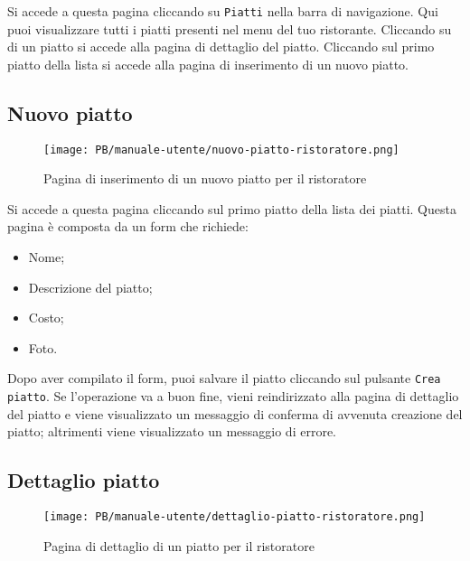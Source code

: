 Si accede a questa pagina cliccando su \texttt{Piatti} nella barra di
navigazione. Qui puoi visualizzare tutti i piatti presenti nel menu del tuo
ristorante. Cliccando su di un piatto si accede alla pagina di dettaglio del
piatto. Cliccando sul primo piatto della lista si accede alla pagina di
inserimento di un nuovo piatto.

\subsection{Nuovo piatto}

\begin{figure}[htbp]
    \centering
	\texttt{[image: PB/manuale-utente/nuovo-piatto-ristoratore.png]}
    \caption{Pagina di inserimento di un nuovo piatto per il ristoratore}
\end{figure}

Si accede a questa pagina cliccando sul primo piatto della lista dei piatti.
Questa pagina è composta da un form che richiede:
\begin{itemize}
	\item Nome;
	\item Descrizione del piatto;
	\item Costo;
	\item Foto.
\end{itemize}

Dopo aver compilato il form, puoi salvare il piatto cliccando sul pulsante
\texttt{Crea piatto}. Se l'operazione va a buon fine, vieni reindirizzato alla
pagina di dettaglio del piatto e viene visualizzato un messaggio di conferma di
avvenuta creazione del piatto; altrimenti viene visualizzato un messaggio di
errore.

\subsection{Dettaglio piatto}

\begin{figure}[htbp]
    \centering
	\texttt{[image: PB/manuale-utente/dettaglio-piatto-ristoratore.png]}
    \caption{Pagina di dettaglio di un piatto per il ristoratore}
\end{figure}

